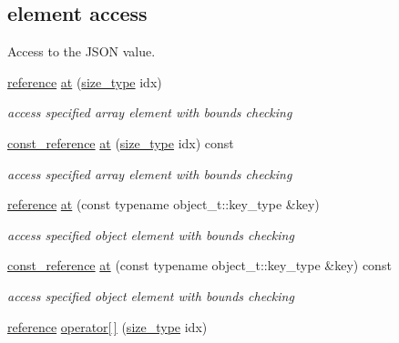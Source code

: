 \subsection*{element access}
\label{_amgrpf68418821a90b03a001117a613b131dd}%
Access to the J\+S\+ON value. \begin{DoxyCompactItemize}
\item 
\mbox{\hyperlink{classnlohmann_1_1basic__json_ac6a5eddd156c776ac75ff54cfe54a5bc}{reference}} \mbox{\hyperlink{classnlohmann_1_1basic__json_a73ae333487310e3302135189ce8ff5d8}{at}} (\mbox{\hyperlink{classnlohmann_1_1basic__json_a39f2cd0b58106097e0e67bf185cc519b}{size\+\_\+type}} idx)
\begin{DoxyCompactList}\small\item\em access specified array element with bounds checking \end{DoxyCompactList}\item 
\mbox{\hyperlink{classnlohmann_1_1basic__json_a4057c5425f4faacfe39a8046871786ca}{const\+\_\+reference}} \mbox{\hyperlink{classnlohmann_1_1basic__json_ab157adb4de8475b452da9ebf04f2de15}{at}} (\mbox{\hyperlink{classnlohmann_1_1basic__json_a39f2cd0b58106097e0e67bf185cc519b}{size\+\_\+type}} idx) const
\begin{DoxyCompactList}\small\item\em access specified array element with bounds checking \end{DoxyCompactList}\item 
\mbox{\hyperlink{classnlohmann_1_1basic__json_ac6a5eddd156c776ac75ff54cfe54a5bc}{reference}} \mbox{\hyperlink{classnlohmann_1_1basic__json_a93403e803947b86f4da2d1fb3345cf2c}{at}} (const typename object\+\_\+t\+::key\+\_\+type \&key)
\begin{DoxyCompactList}\small\item\em access specified object element with bounds checking \end{DoxyCompactList}\item 
\mbox{\hyperlink{classnlohmann_1_1basic__json_a4057c5425f4faacfe39a8046871786ca}{const\+\_\+reference}} \mbox{\hyperlink{classnlohmann_1_1basic__json_acac9d438c9bb12740dcdb01069293a34}{at}} (const typename object\+\_\+t\+::key\+\_\+type \&key) const
\begin{DoxyCompactList}\small\item\em access specified object element with bounds checking \end{DoxyCompactList}\item 
\mbox{\hyperlink{classnlohmann_1_1basic__json_ac6a5eddd156c776ac75ff54cfe54a5bc}{reference}} \mbox{\hyperlink{classnlohmann_1_1basic__json_ac871e3b03fb2eeca9a8de4db2bea760f}{operator\mbox{[}$\,$\mbox{]}}} (\mbox{\hyperlink{classnlohmann_1_1basic__json_a39f2cd0b58106097e0e67bf185cc519b}{size\+\_\+type}} idx)

\end{DoxyCompactItemize}
